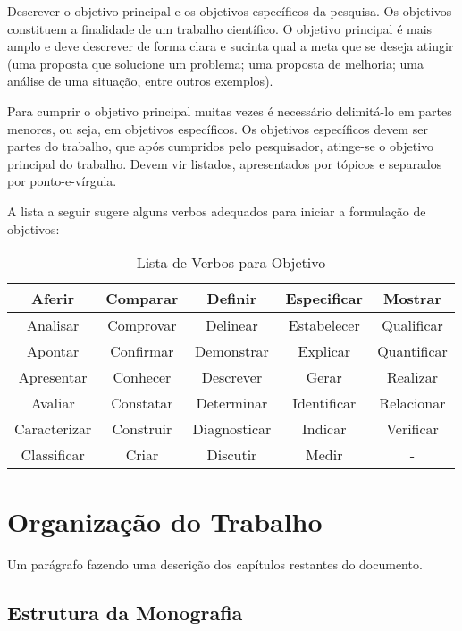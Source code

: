 Descrever o objetivo principal e os objetivos específicos da pesquisa. Os objetivos constituem a finalidade de um trabalho científico. O objetivo principal é mais amplo e deve descrever de forma clara e sucinta qual a meta que se deseja atingir (uma proposta que solucione um problema; uma proposta de melhoria; uma análise de uma situação, entre outros exemplos). 

Para cumprir o objetivo principal muitas vezes é necessário delimitá-lo em partes menores, ou seja, em objetivos específicos. Os objetivos específicos devem ser partes do trabalho, que após cumpridos pelo pesquisador, atinge-se  o objetivo principal do trabalho. Devem vir listados, apresentados por tópicos e separados por ponto-e-vírgula.

A lista a seguir sugere alguns verbos adequados para iniciar a formulação de
objetivos:

\begin{table}[h]
\centering
\begin{tabular}{|c|c|c|c|c|}
\hline
Aferir       & Comparar  & Definir      & Especificar & Mostrar     \\ \hline
Analisar     & Comprovar & Delinear     & Estabelecer & Qualificar  \\ \hline
Apontar      & Confirmar & Demonstrar   & Explicar    & Quantificar \\ \hline
Apresentar   & Conhecer  & Descrever    & Gerar       & Realizar    \\ \hline
Avaliar      & Constatar & Determinar   & Identificar & Relacionar  \\ \hline
Caracterizar & Construir & Diagnosticar & Indicar     & Verificar   \\ \hline
Classificar  & Criar     & Discutir     & Medir       & -           \\ \hline
\end{tabular}
\caption{Lista de Verbos para Objetivo}
\label{tab1:lista de verbos para objetivo}
\end{table}


\section{Organização do Trabalho}

Um parágrafo fazendo uma descrição dos capítulos restantes do documento. 

\subsection{Estrutura da Monografia}

